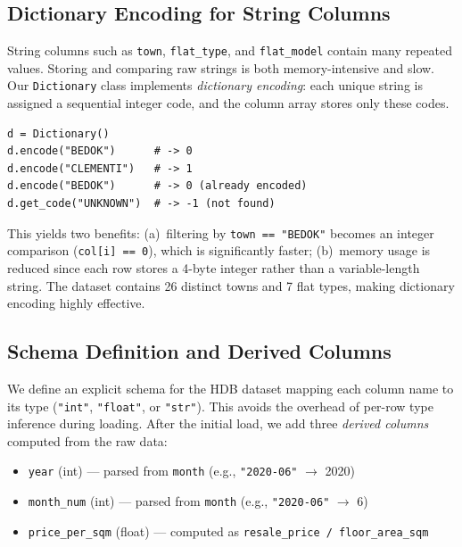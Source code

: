 \documentclass[11pt,a4paper]{article}
\begin{document}
\subsection{Dictionary Encoding for String Columns}

String columns such as \texttt{town}, \texttt{flat\_type}, and \texttt{flat\_model} contain many repeated values. Storing and comparing raw strings is both memory-intensive and slow. Our \texttt{Dictionary} class implements \emph{dictionary encoding}: each unique string is assigned a sequential integer code, and the column array stores only these codes.

\begin{lstlisting}[caption={Dictionary encoding example}, label={lst:dict}]
d = Dictionary()
d.encode("BEDOK")      # -> 0
d.encode("CLEMENTI")   # -> 1
d.encode("BEDOK")      # -> 0 (already encoded)
d.get_code("UNKNOWN")  # -> -1 (not found)
\end{lstlisting}

This yields two benefits: (a)~filtering by \texttt{town == "BEDOK"} becomes an integer comparison (\texttt{col[i] == 0}), which is significantly faster; (b)~memory usage is reduced since each row stores a 4-byte integer rather than a variable-length string. The dataset contains 26 distinct towns and 7 flat types, making dictionary encoding highly effective.

\subsection{Schema Definition and Derived Columns}

We define an explicit schema for the HDB dataset mapping each column name to its type (\texttt{"int"}, \texttt{"float"}, or \texttt{"str"}). This avoids the overhead of per-row type inference during loading. After the initial load, we add three \emph{derived columns} computed from the raw data:

\begin{itemize}[nosep]
    \item \texttt{year} (int) --- parsed from \texttt{month} (e.g., \texttt{"2020-06"} $\to$ 2020)
    \item \texttt{month\_num} (int) --- parsed from \texttt{month} (e.g., \texttt{"2020-06"} $\to$ 6)
    \item \texttt{price\_per\_sqm} (float) --- computed as \texttt{resale\_price / floor\_area\_sqm}
\end{itemize}
\end{document}
